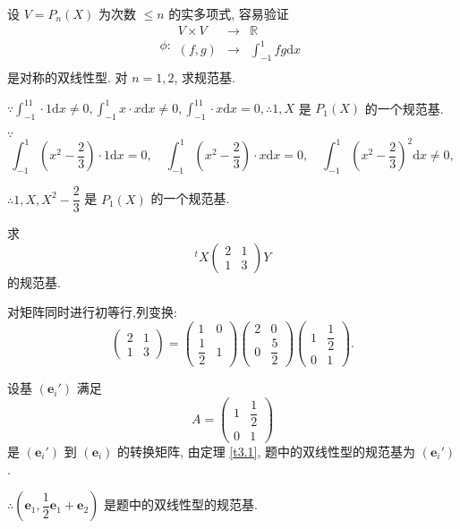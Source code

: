 \documentclass{ctexart}
\begin{document}
\begin{exercisec}%
    设 $V=P_n(X)$ 为次数 $\leq n$ 的实多项式, 容易验证
    \[\phi:\begin{array}{rcl}
        V\times V & \to & \mathbb{R} \\
        (f,g) & \to & \int_{-1}^1fg\mathrm{d}x \\
    \end{array}\]
    是对称的双线性型. 对 $n=1,2$, 求规范基.
\end{exercisec}
\begin{solution}
    $\because\int_{-1}^11\cdot 1\mathrm{d}x\neq0,\int_{-1}^1x\cdot x\mathrm{d}x\neq0,\int_{-1}^11\cdot x\mathrm{d}x=0,\therefore1,X$ 是 $P_1(X)$ 的一个规范基.

    $\because$
    \[\int_{-1}^1\left(x^2-\dfrac{2}{3}\right)\cdot 1\mathrm{d}x=0,\quad\int_{-1}^1\left(x^2-\dfrac{2}{3}\right)\cdot x\mathrm{d}x=0,\quad\int_{-1}^1\left(x^2-\dfrac{2}{3}\right)^2\mathrm{d}x\neq0,\]

    $\therefore1,X,X^2-\dfrac{2}{3}$ 是 $P_1(X)$ 的一个规范基.
\end{solution}
\begin{exercisec}\label{exc3}
    求
    \[^tX\begin{pmatrix}
        2 & 1 \\
        1 & 3
    \end{pmatrix}Y\]
    的规范基.
\end{exercisec}
\begin{solution}
    对矩阵同时进行初等行,列变换:
    \[\begin{pmatrix}
            2 & 1 \\
            1 & 3
        \end{pmatrix}=\begin{pmatrix}
            1 & 0 \\
            \dfrac{1}{2} & 1
        \end{pmatrix}\begin{pmatrix}
            2 & 0 \\
            0 & \dfrac{5}{2}
        \end{pmatrix}\begin{pmatrix}
            1 & \dfrac{1}{2} \\
            0 & 1
        \end{pmatrix}.\]

        设基 $(\boldsymbol{e}_i')$ 满足
        \[A=\begin{pmatrix}
            1 & \dfrac{1}{2} \\
            0 & 1
        \end{pmatrix}\]
        是 $(\boldsymbol{e}_i')$ 到 $(\boldsymbol{e}_i)$ 的转换矩阵, 由定理 \ref{t3.1}, 题中的双线性型的规范基为 $(\boldsymbol{e}_i')$.

        $\therefore\left(\boldsymbol{e}_1,\dfrac{1}{2}\boldsymbol{e}_1+\boldsymbol{e}_2\right)$ 是题中的双线性型的规范基.
\end{solution}
\end{document}
